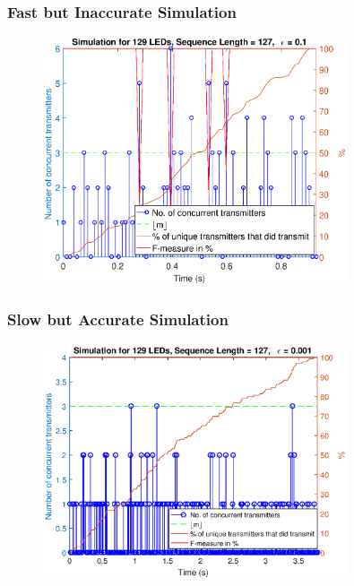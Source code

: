 \documentclass{beamer}
\begin{document}
	\begin{frame}\frametitle{Fast but Inaccurate Simulation}
		
		\begin{figure}
			\centering
			\includegraphics[width=0.8\textwidth]{../chapters/evaluation-chapters/simulation/sim-concurrent-tx-and-f-measure-eps=1-n=7}
		\end{figure}

	\end{frame}

	\begin{frame}\frametitle{Slow but Accurate Simulation}
		
		\begin{figure}
			\centering
			\includegraphics[width=0.8\textwidth]{../chapters/evaluation-chapters/simulation/sim-concurrent-tx-and-f-measure-eps=001-n=7}
		\end{figure}

	\end{frame}
\end{document}

